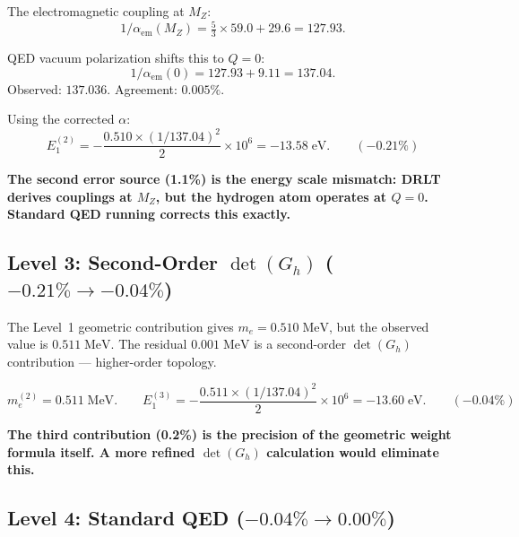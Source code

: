 \documentclass[12pt]{article}
\theoremstyle{remark}
\theoremstyle{definition}
\begin{document}
The electromagnetic coupling at $M_Z$:
\begin{equation}
1/\alpha_\text{em}(M_Z) = \tfrac{5}{3} \times 59.0 + 29.6 = 127.93.
\end{equation}

QED vacuum polarization shifts this to $Q = 0$:
\begin{equation}
1/\alpha_\text{em}(0) = 127.93 + 9.11 = 137.04.
\end{equation}
Observed: $137.036$. Agreement: $0.005\%$.

Using the corrected $\alpha$:
\begin{equation}
E_1^{(2)} = -\frac{0.510 \times (1/137.04)^2}{2} \times 10^6 = -13.58\;\text{eV}. \qquad (-0.21\%)
\end{equation}

\textbf{The second error source (1.1\%) is the energy scale mismatch: DRLT derives couplings at $M_Z$, but the hydrogen atom operates at $Q = 0$. Standard QED running corrects this exactly.}

\subsection{Level 3: Second-Order $\det(G_h)$ ($-0.21\% \to -0.04\%$)}

The Level~1 geometric contribution gives $m_e = 0.510\;\text{MeV}$, but the observed value is $0.511\;\text{MeV}$. The residual $0.001\;\text{MeV}$ is a second-order $\det(G_h)$ contribution --- higher-order topology.

\begin{equation}
m_e^{(2)} = 0.511\;\text{MeV}. \qquad E_1^{(3)} = -\frac{0.511 \times (1/137.04)^2}{2} \times 10^6 = -13.60\;\text{eV}. \qquad (-0.04\%)
\end{equation}

\textbf{The third contribution (0.2\%) is the precision of the geometric weight formula itself. A more refined $\det(G_h)$ calculation would eliminate this.}

\subsection{Level 4: Standard QED ($-0.04\% \to 0.00\%$)}
\end{document}

